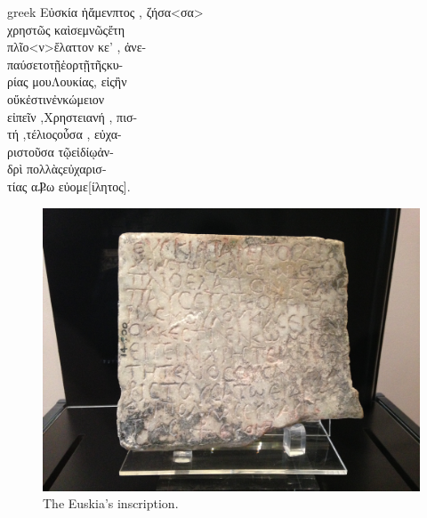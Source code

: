 \documentclass[amsthm,ebook]{saparticle}
\begin{document}
\begin{otherlanguage*}{greek}
Εὐσκία ἡἄμενπτος , ζήσα<σα> \\
 χρηστῶς καὶσεμνῶςἔτη \\ 
 πλῖο<ν>ἔλαττον κε' , ἀνε-\\ 
 παύσετοτῇἑορτῇτῆςκυ-\\
ρίας μουΛουκίας, εἰςἢν \\
 οὔκἐστινἐνκώμειον \\
 εἰπεῖν ,Xρηστειανή , πισ-\\ 
 τή ,τέλιοςοὖσα , εὐχα- \\
 ριστοῦσα τῷεἰδίῳἀν- \\
 δρὶ πολλὰςεὐχαρισ-\\
τίας αⳀω εὐομε[ίλητος].
\end{otherlanguage*}

\begin{figure}[hbp]
\centering
 \includegraphics[width=\columnwidth]{Euskia.JPG}
\caption{ The Euskia’s inscription.}
\label{fig:3}
\end{figure}
\end{document}
